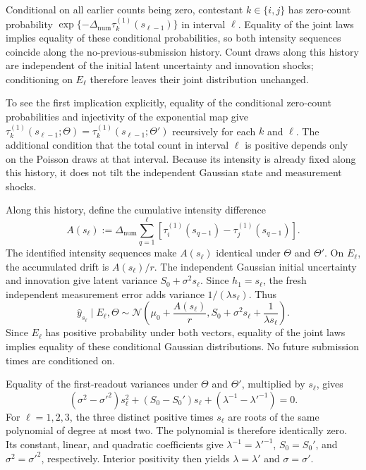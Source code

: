 \documentclass[mnsc]{informs3}
\begin{document}
\begin{APPENDICES}
{Conditional on all earlier counts being zero, contestant $k\in\{i,j\}$ has zero-count probability $\exp\{-\Delta_{\mathrm{num}}\tau_k^{(1)}(s_{\ell-1})\}$ in interval $\ell$. Equality of the joint laws implies equality of these conditional probabilities, so both intensity sequences coincide along the no-previous-submission history. Count draws along this history are independent of the initial latent uncertainty and innovation shocks; conditioning on $E_\ell$ therefore leaves their joint distribution unchanged.

To see the first implication explicitly, equality of the conditional
zero-count probabilities and injectivity of the exponential map give
$\tau_k^{(1)}(s_{\ell-1};\Theta)
=\tau_k^{(1)}(s_{\ell-1};\Theta')$ recursively for each $k$ and $\ell$.
The additional condition that the total count in interval $\ell$ is
positive depends only on the Poisson draws at that interval. Because its
intensity is already fixed along this history, it does not tilt the
independent Gaussian state and measurement shocks.

Along this history, define the cumulative intensity difference
\begin{equation}\label{eq-local-id-A}
A(s_\ell):=\Delta_{\mathrm{num}}\sum_{q=1}^{\ell}
\left[\tau_i^{(1)}(s_{q-1})-\tau_j^{(1)}(s_{q-1})\right].
\end{equation}
The identified intensity sequences make $A(s_\ell)$ identical under $\Theta$ and $\Theta'$.
On $E_\ell$, the accumulated drift is $A(s_\ell)/r$. The independent Gaussian initial uncertainty and innovation give latent variance $S_0+\sigma^2s_\ell$. Since $h_1=s_\ell$, the fresh independent measurement error adds variance $1/(\lambda s_\ell)$. Thus
\begin{equation}\label{eq-local-id-conditional-law}
\hat y_{s_\ell}\mid E_\ell,\Theta
\sim\mathcal N\!\left(
\mu_0+\frac{A(s_\ell)}r,
S_0+\sigma^2s_\ell+\frac{1}{\lambda s_\ell}
\right).
\end{equation}
Since $E_\ell$ has positive probability under both vectors, equality of the joint laws implies equality of these conditional Gaussian distributions. No future submission times are conditioned on.

Equality of the first-readout variances under $\Theta$ and $\Theta'$, multiplied by $s_\ell$, gives
\[
(\sigma^2-\sigma'^2)s_\ell^2
+(S_0-S_0')s_\ell
+\left(\lambda^{-1}-\lambda'^{-1}\right)=0.
\]
For $\ell=1,2,3$, the three distinct positive times $s_\ell$ are roots
of the same polynomial of degree at most two. The polynomial is therefore
identically zero. Its constant, linear, and quadratic coefficients give
$\lambda^{-1}=\lambda'^{-1}$, $S_0=S_0'$, and
$\sigma^2=\sigma'^2$, respectively. Interior positivity then yields
$\lambda=\lambda'$ and $\sigma=\sigma'$.

}
\end{APPENDICES}
\end{document}
